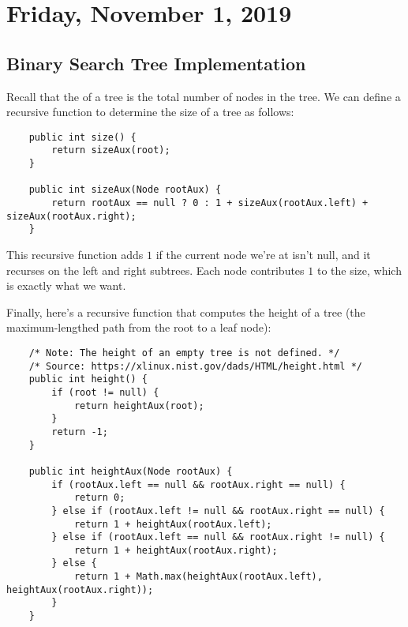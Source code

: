 \section{Friday, November 1, 2019}

\subsection{Binary Search Tree Implementation}
    
Recall that the  of a tree is the total number of nodes in the tree.  We can define a recursive function to determine the size of a tree as follows:


\begin{lstlisting}
	public int size() {
		return sizeAux(root);
	}

	public int sizeAux(Node rootAux) {
		return rootAux == null ? 0 : 1 + sizeAux(rootAux.left) + sizeAux(rootAux.right);
	}
\end{lstlisting}

This recursive function adds $1$ if the current node we're at isn't null, and it recurses on the left and right subtrees. Each node contributes $1$ to the size, which is exactly what we want.


Finally, here's a recursive function that computes the height of a tree (the maximum-lengthed path from the root to a leaf node):

\begin{lstlisting}
    /* Note: The height of an empty tree is not defined. */
	/* Source: https://xlinux.nist.gov/dads/HTML/height.html */
	public int height() {
		if (root != null) {
			return heightAux(root);
		}
		return -1;
	}
	
	public int heightAux(Node rootAux) {
		if (rootAux.left == null && rootAux.right == null) {
			return 0;
		} else if (rootAux.left != null && rootAux.right == null) {
			return 1 + heightAux(rootAux.left);
		} else if (rootAux.left == null && rootAux.right != null) {
			return 1 + heightAux(rootAux.right);
		} else {
			return 1 + Math.max(heightAux(rootAux.left), heightAux(rootAux.right));
		}
	}
\end{lstlisting}